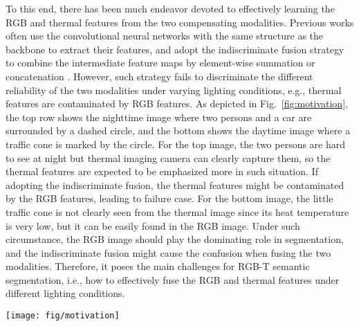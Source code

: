 \documentclass[10.5pt,twocolumn,journal,letterpaper]{IEEEtran}
\newcommand{\eg}{e.g.}
\newcommand{\ie}{i.e.}
\begin{document}
To this end, there has been much endeavor devoted to effectively learning the RGB and thermal features from the two compensating modalities. Previous works \cite{ha-iros2017-mfnet,sun-ral2019-rtfnet,sun-tase2021-fuseseg} often use the convolutional neural networks with the same structure as the backbone to extract their features, and adopt the indiscriminate fusion strategy to combine the intermediate feature maps by element-wise summation \cite{sun-ral2019-rtfnet,sun-tase2021-fuseseg} or concatenation \cite{ha-iros2017-mfnet}. However, such strategy fails to discriminate the different reliability of the two modalities under varying lighting conditions, \eg, thermal features are contaminated by RGB features. As depicted in Fig.~\ref{fig:motivation}, the top row shows the nighttime image where two persons and a car are surrounded by a dashed circle, and the bottom shows the daytime image where a traffic cone is marked by the circle. For the top image, the two persons are hard to see at night but thermal imaging camera can clearly capture them, so the thermal features are expected to be emphasized more in such situation. If adopting the indiscriminate fusion, the thermal features might be contaminated by the RGB features, leading to failure case. For the bottom image, the little traffic cone is not clearly seen from the thermal image since its heat temperature is very low, but it can be easily found in the RGB image. Under such circumstance, the RGB image should play the dominating role in segmentation, and the indiscriminate fusion might cause the confusion when fusing the two modalities. Therefore, it poses the main challenges for RGB-T semantic segmentation, \ie, how to effectively fuse the RGB and thermal features under different lighting conditions.

\begin{figure*}[!t]
	\centering
\texttt{[image: fig/motivation]}
	\caption{The RGB-T semantic segmentation results. The top row shows the nighttime image and the bottom row shows the daytime image. (a) RGB image; (b) Thermal image; (c) Ground truth; (d) MFNet~\cite{ha-iros2017-mfnet}; (e) RTFNet~\cite{sun-ral2019-rtfnet}; (f) Ours.}
	\label{fig:motivation}
\end{figure*}
\end{document}

